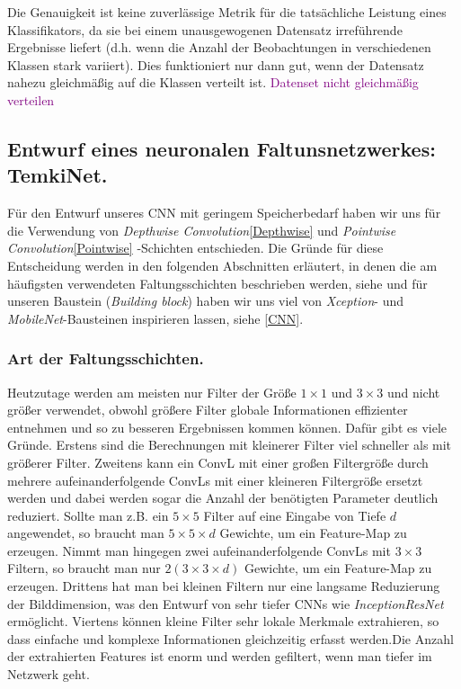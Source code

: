 \documentclass[12pt,a4paper]{scrartcl}
\numberwithin{equation}{section}
\begin{document}
 Die Genauigkeit ist keine zuverlässige Metrik für die tatsächliche Leistung eines Klassifikators, da sie bei einem unausgewogenen Datensatz irreführende Ergebnisse liefert (d.h. wenn die Anzahl der Beobachtungen in verschiedenen Klassen stark variiert).
Dies funktioniert nur dann gut, wenn der Datensatz nahezu gleichmäßig auf die Klassen verteilt ist.
\textcolor{purple}{Datenset nicht gleichmäßig verteilen}

\subsection{Entwurf eines neuronalen Faltunsnetzwerkes: TemkiNet.}
Für den Entwurf unseres \ac{CNN} mit geringem Speicherbedarf haben wir uns für die Verwendung von \textit{Depthwise Convolution}\ref{Depthwise} und \textit{Pointwise Convolution}\ref{Pointwise} -Schichten entschieden. Die Gründe für diese Entscheidung werden in den folgenden Abschnitten erläutert, in denen die am häufigsten verwendeten Faltungsschichten beschrieben werden, siehe und für unseren Baustein (\textit{Building block}) haben wir uns viel von \textit{Xception}- und \textit{MobileNet}-Bausteinen inspirieren lassen, siehe \ref{CNN}. 

\subsubsection{Art der Faltungsschichten.}
Heutzutage werden am meisten nur Filter der Größe $ 1\times 1 $ und $ 3\times 3 $ und nicht größer verwendet, obwohl größere Filter globale Informationen effizienter entnehmen und so zu besseren Ergebnissen kommen können. Dafür gibt es viele Gründe. Erstens sind die Berechnungen mit kleinerer Filter viel schneller als mit größerer Filter. Zweitens kann ein \ac{ConvL} mit einer großen Filtergröße durch mehrere aufeinanderfolgende \acsp{ConvL} mit einer kleineren Filtergröße ersetzt werden und dabei werden sogar die Anzahl der benötigten Parameter deutlich reduziert. Sollte man z.B. ein $ 5\times 5 $ Filter auf eine Eingabe von Tiefe $ d $ angewendet, so braucht man $ 5\times 5\times d $ Gewichte, um ein Feature-Map zu erzeugen. Nimmt man hingegen zwei aufeinanderfolgende \acsp{ConvL} mit $ 3\times 3$ Filtern, so braucht man nur $ 2(3\times 3\times d) $ Gewichte, um ein Feature-Map zu erzeugen. Drittens hat man bei kleinen Filtern nur eine langsame Reduzierung der Bilddimension, was den Entwurf von sehr tiefer \ac{CNN}s wie \textit{InceptionResNet} ermöglicht. Viertens können kleine Filter sehr lokale Merkmale extrahieren, so dass einfache und komplexe Informationen gleichzeitig erfasst werden.Die Anzahl der extrahierten Features ist enorm und werden gefiltert, wenn man tiefer im Netzwerk geht.
\end{document}
